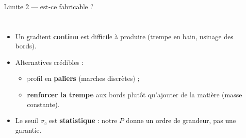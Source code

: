 \documentclass[11pt,aspectratio=169]{beamer}
\begin{document}
\begin{frame}{Limite 2 --- est-ce fabricable ?}
  \begin{columns}[c]
    \centering
    \footnotesize
    \begin{itemize}
      \item Un gradient \textbf{continu} est difficile à produire (trempe en
            bain, usinage des bords).
      \item Alternatives crédibles :
      \begin{itemize}\scriptsize
        \item profil en \textbf{paliers} (marches discrètes) ;
        \item \textbf{renforcer la trempe} aux bords plutôt qu'ajouter de la
              matière (masse constante).
      \end{itemize}
      \item Le seuil $\sigma_c$ est \textbf{statistique} : notre $P$ donne un
            ordre de grandeur, pas une garantie.
    \end{itemize}
  \end{columns}
\end{frame}
\end{document}
